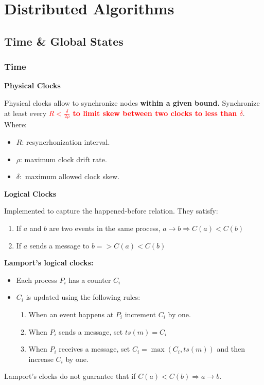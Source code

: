 \section{Distributed Algorithms}

\subsection{Time \& Global States}
\subsubsection*{Time}

\textbf{Physical Clocks}

Physical clocks allow to synchronize nodes \textbf{within a given bound.} Synchronize at least every \textbf{\textcolor{red}{$R < \frac{\delta}{2\rho}$ to limit skew between two clocks to less than $\delta$}}.
Where:
\begin{itemize}
    \item $R$: resyncrhonization interval.
    \item $\rho$: maximum clock drift rate.
    \item $\delta:$ maximum allowed clock skew.
\end{itemize}


\textbf{Logical Clocks}

Implemented to capture the happened-before relation. They satisfy:
\begin{enumerate}
    \item If $a$ and $b$ are two events in the same process, $a \rightarrow b \Rightarrow C(a) < C(b)$
    \item If $a$ sends a message to $b => C(a) < C(b)$
\end{enumerate}

\textbf{Lamport's logical clocks:}

\begin{itemize}
    \item Each process $P_i$ has a counter $C_i$
    \item $C_i$ is updated using the following rules:
    \begin{enumerate}
        \item When an event happens at $P_i$ increment $C_i$ by one.
        \item When $P_i$ sends a message, set $ts(m) = C_i$
        \item When $P_i$ receives a message, set $C_i = \max(C_i, ts(m))$ and then increase $C_i$ by one. 
    \end{enumerate}
\end{itemize}
Lamport's clocks do not guarantee that if $C(a) < C(b) \Rightarrow a \rightarrow b$.

